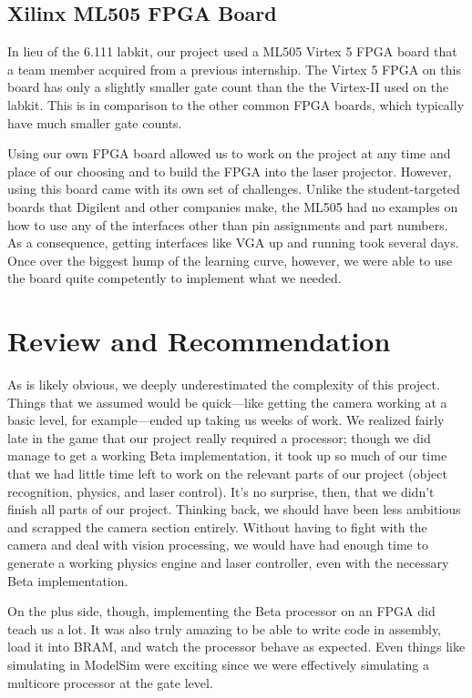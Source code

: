 \documentclass{article}
\begin{document}
\subsection{Xilinx ML505 FPGA Board} \label{board}

In lieu of the 6.111 labkit, our project used a ML505 Virtex 5 FPGA board that a team member acquired from a previous internship. The Virtex 5 FPGA on this board has only a slightly smaller gate count than the the Virtex-II used on the labkit. This is in comparison to the other common FPGA boards, which typically have much smaller gate counts.

Using our own FPGA board allowed us to work on the project at any time and place of our choosing and to build the FPGA into the laser projector. However, using this board came with its own set of challenges. Unlike the student-targeted boards that Digilent and other companies make, the ML505 had no examples on how to use any of the interfaces other than pin assignments and part numbers. As a consequence, getting interfaces like VGA up and running took several days. Once over the biggest hump of the learning curve, however, we were able to use the board quite competently to implement what we needed. 

\section{Review and Recommendation}

As is likely obvious, we deeply underestimated the complexity of this project. Things that we assumed would be quick---like getting the camera working at a basic level, for example---ended up taking us weeks of work. We realized fairly late in the game that our project really required a processor; though we did manage to get a working Beta implementation, it took up so much of our time that we had little time left to work on the relevant parts of our project (object recognition, physics, and laser control). It's no surprise, then, that we didn't finish all parts of our project. Thinking back, we should have been less ambitious and scrapped the camera section entirely. Without having to fight with the camera and deal with vision processing, we would have had enough time to generate a working physics engine and laser controller, even with the necessary Beta implementation.

On the plus side, though, implementing the Beta processor on an FPGA did teach us a lot. It was also truly amazing to be able to write code in assembly, load it into BRAM, and watch the processor behave as expected. Even things like simulating in ModelSim were exciting since we were effectively simulating a multicore processor at the gate level. 
\end{document}
